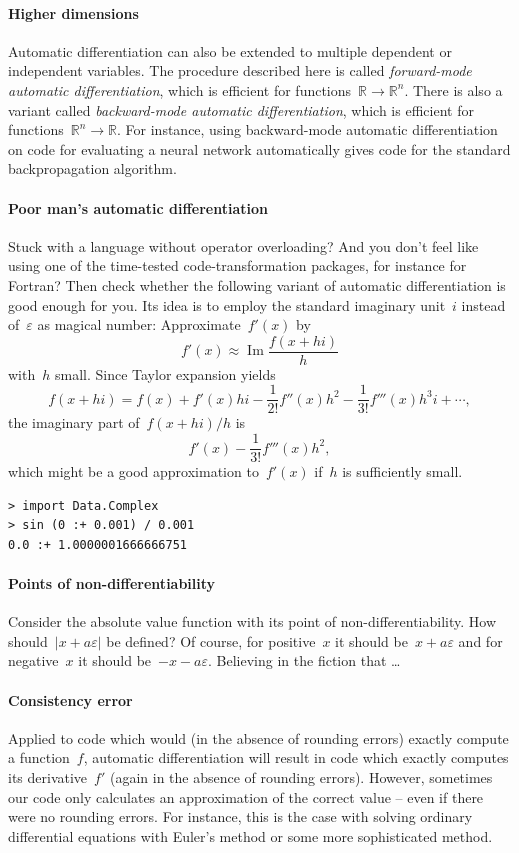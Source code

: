 \documentclass[a4paper,ngerman,12pt]{scrartcl}
\theoremstyle{definition}
\theoremstyle{plain}
\theoremstyle{remark}
\newcommand{\RR}{\mathbb{R}}
\begin{document}
\paragraph{Higher dimensions} Automatic differentiation can also be extended to
multiple dependent or independent variables. The procedure described here is
called \emph{forward-mode automatic differentiation}, which is efficient for
functions~$\RR \to \RR^n$. There is also a variant called \emph{backward-mode
automatic differentiation}, which is efficient for functions~$\RR^n \to \RR$.
For instance, using backward-mode automatic differentiation on code for
evaluating a neural network automatically gives code for the standard
backpropagation algorithm.

\paragraph{Poor man's automatic differentiation} Stuck with a language without
operator overloading? And you don't feel like using one of the time-tested
code-transformation packages, for instance for Fortran? Then check whether the
following variant of automatic differentiation is good enough for you. Its idea
is to employ the standard imaginary unit~$i$ instead of~$\varepsilon$ as
magical number: Approximate~$f'(x)$ by
\[ f'(x) \approx \operatorname{Im} \frac{f(x+hi)}{h} \]
with~$h$ small. Since Taylor expansion yields
\[ f(x+hi) = f(x) + f'(x)hi - \frac{1}{2!}f''(x)h^2 - \frac{1}{3!}f'''(x)h^3i +
\cdots, \]
the imaginary part of~$f(x+hi)/h$ is
\[ f'(x) - \frac{1}{3!} f'''(x) h^2, \]
which might be a good approximation to~$f'(x)$ if~$h$ is sufficiently small.

\begin{verbatim}> import Data.Complex
> sin (0 :+ 0.001) / 0.001
0.0 :+ 1.0000001666666751
\end{verbatim}

\paragraph{Points of non-differentiability} Consider the absolute value
function with its point of non-differentiability. How should~$|x +
a\varepsilon|$ be defined? Of course, for positive~$x$ it should be~$x +
a\varepsilon$ and for negative~$x$ it should be~$-x - a\varepsilon$. Believing
in the fiction that \ldots

\paragraph{Consistency error} Applied to code which would (in the absence of
rounding errors) exactly compute a function~$f$, automatic differentiation will
result in code which exactly computes its derivative~$f'$ (again in the absence
of rounding errors). However, sometimes our code only calculates an
approximation of the correct value -- even if there were no rounding errors.
For instance, this is the case with solving ordinary differential equations
with Euler's method or some more sophisticated method.
\end{document}
